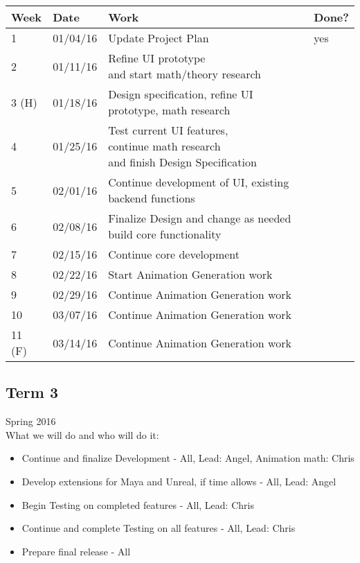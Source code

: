 \begin{table}[H]
\centering
\begin{tabular}{|l|l|l|l|}
\hline
Week 	& Date	 		& Work	 		& 	Done?	 \\ \hline
1		& 01/04/16	 	& Update Project Plan		& 	yes	 \\ \hline
2		& 01/11/16	 	& \specialcell{Refine UI prototype  \\ and start math/theory research}		& 			 \\ \hline
3 (H)	& 01/18/16	 	& Design specification, refine UI prototype, math research		& 			 \\ \hline
4		& 01/25/16	 	& \specialcell{Test current UI features, \\ continue math research \\ and finish Design Specification}		& 			 \\ \hline
5		& 02/01/16	 	& Continue development of UI, existing backend functions	& 			 \\ \hline
6		& 02/08/16	 	& \specialcell{Finalize Design and change as needed \\ build core functionality}		& 			 \\ \hline
7		& 02/15/16	 	& Continue core development		& 			 \\ \hline
8		& 02/22/16	 	& Start Animation Generation work		& 			 \\ \hline
9		& 02/29/16	 	& Continue Animation Generation work		& 			 \\ \hline
10		& 03/07/16	 	& Continue Animation Generation work			& 			 \\ \hline
11 (F)	& 03/14/16	 	& Continue Animation Generation work			& 			 \\ \hline
\end{tabular}
\end{table}

\subsection{Term 3}
Spring 2016 \\
What we will do and who will do it:
\begin{itemize}
	\item Continue and finalize Development - All, Lead: Angel, Animation math: Chris
	\item Develop extensions for Maya and Unreal, if time allows - All, Lead: Angel
	\item Begin Testing on completed features - All, Lead: Chris
	\item Continue and complete Testing on all features - All, Lead: Chris
	\item Prepare final release - All
\end{itemize}

